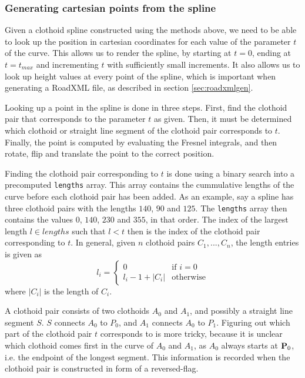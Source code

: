 \subsubsection{Generating cartesian points from the spline}
Given a clothoid spline constructed using the methods above, we need to be able to look up the position in cartesian coordinates for each value of the parameter $t$ of the curve. This allows us to render the spline, by starting at $t=0$, ending at $t=t_{max}$ and incrementing $t$ with sufficiently small increments. It also allows us to look up height values at every point of the spline, which is important when generating a RoadXML file, as described in section \ref{sec:roadxmlgen}.

Looking up a point in the spline is done in three steps. First, find the clothoid pair that corresponds to the parameter $t$ as given. Then, it must be determined which clothoid or straight line segment of the clothoid pair corresponds to $t$. Finally, the point is computed by evaluating the Fresnel integrals, and then rotate, flip and translate the point to the correct position.  

Finding the clothoid pair corresponding to $t$ is done using a binary search into a precomputed \texttt{lengths} array. This array contains the cummulative lengths of the curve before each clothoid pair has been added. As an example, say a spline has three clothoid pairs with the lengths $140$, $90$ and $125$. The \texttt{lengths} array then contains the values $0$, $140$, $230$ and $355$, in that order. The index of the largest length $l\in lengths$ such that $l < t$ then is the index of the clothoid pair corresponding to $t$. In general, given $n$ clothoid pairs $C_1, ..., C_n$, the length entries is given as
$$
l_i = 
\begin{cases}
0 & \mbox{if $i = 0$}\\
l_i-1+|C_i| & \mbox{otherwise}
\end{cases}
$$
where $|C_i|$ is the length of $C_i$.

A clothoid pair consists of two clothoids $A_0$ and $A_1$, and possibly a straight line segment $S$. $S$ connects $A_0$ to $P_0$, and $A_1$ connects $A_0$ to $P_1$. Figuring out which part of the clothoid pair $t$ corresponds to is more tricky, because it is unclear which clothoid comes first in the curve of $A_0$ and $A_1$, as $A_0$ always starts at ${\mathbf P}_0$, i.e. the endpoint of the longest segment. This information is recorded when the clothoid pair is constructed in form of a reversed-flag.

